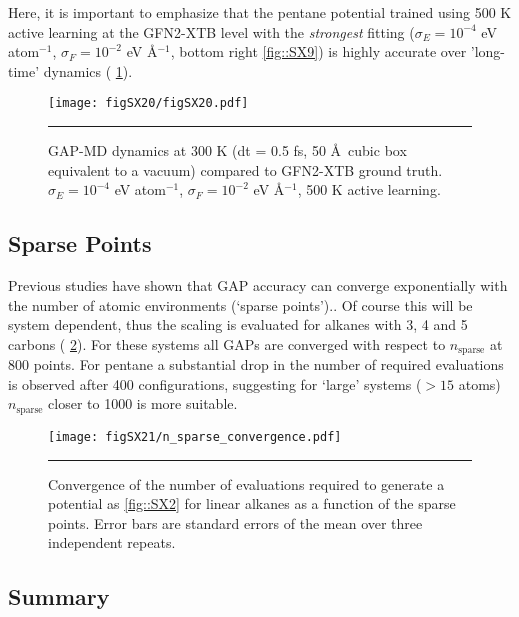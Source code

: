 \documentclass[11pt]{article}
\numberwithin{equation}{subsection}
\begin{document}
Here, it is important to emphasize that the pentane potential trained using 500 K active learning at the GFN2-XTB level with the \emph{strongest} fitting ($\sigma_E = 10^{-4}$ eV atom${}^{-1}$, $\sigma_F = 10^{-2}$ eV \AA$^{-1}$, bottom right \figurename{ \ref{fig::SX9}}) is highly accurate over 'long-time' dynamics (\figurename{ \ref{fig::SX20}}).


\begin{figure}[h!]
	\centering
	\texttt{[image: figSX20/figSX20.pdf]}
	\vspace{0.1cm}
	\hrule
	\vspace{0.1cm}
	\caption{GAP-MD dynamics at 300 K (dt = 0.5 fs, 50 \AA~cubic box equivalent to a vacuum) compared to GFN2-XTB ground truth. $\sigma_E = 10^{-4}$ eV atom${}^{-1}$, $\sigma_F = 10^{-2}$ eV \AA$^{-1}$, 500 K active learning.}
	\label{fig::SX20}
\end{figure}


\newpage
\subsection{Sparse Points}

Previous studies have shown that GAP accuracy can converge exponentially with the number of atomic environments (`sparse points').\cite{Rowe2020}. Of course this will be system dependent, thus the scaling is evaluated for alkanes with 3, 4 and 5 carbons (\figurename{ \ref{fig::SX21}}). For these systems all GAPs are converged with respect to $n_\text{sparse}$ at 800 points. For pentane a substantial drop in the number of required evaluations is observed after 400 configurations, suggesting for `large' systems ($>15$ atoms) $n_\text{sparse}$ closer to 1000 is more suitable.


\begin{figure}[h!]
	\centering
	\texttt{[image: figSX21/n\_sparse\_convergence.pdf]}
	\vspace{0.1cm}
	\hrule
	\vspace{0.1cm}
	\caption{Convergence of the number of evaluations required to generate a potential as \figurename{ \ref{fig::SX2}} for linear alkanes as a function of the sparse points. Error bars are standard errors of the mean over three independent repeats.}
	\label{fig::SX21}
\end{figure}


\subsection{Summary}
\end{document}
